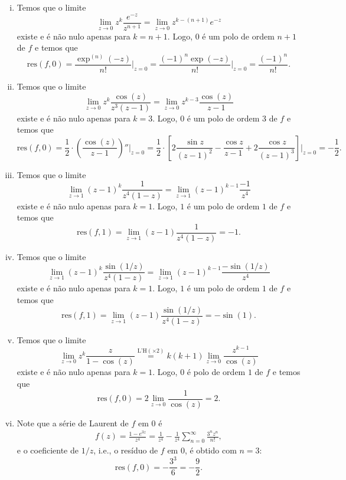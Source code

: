 \documentclass[12pt,a4paper]{article}
\newcommand{\res}{\mathrm{res}}
\begin{document}
\begin{enumerate}
\begin{enumerate}[(i)]
			\item Temos que o limite
			$$
			\lim\limits_{z\to 0}z^k\frac{e^{-z}}{z^{n+1}} = \lim\limits_{z\to 0}z^{k-(n+1)}e^{-z}
			$$
			existe e é não nulo apenas para $k=n+1$. Logo, $0$ é um polo de ordem $n+1$ de $f$ e temos que
			$$
			\res(f,0) = \frac{\exp^{(n)}(-z)}{n!}\Bigg|_{z=0} = \frac{(-1)^n\exp(-z)}{n!}\Bigg|_{z=0} = \frac{(-1)^n}{n!}.
			$$
			
			\item Temos que o limite
			$$
			\lim\limits_{z\to 0}z^k\frac{\cos(z)}{z^3(z-1)} = \lim\limits_{z\to 0}z^{k-3}\frac{\cos(z)}{z-1}
			$$
			existe e é não nulo apenas para $k=3$. Logo, $0$ é um polo de ordem $3$ de $f$ e temos que
			$$
			\res(f,0) = \frac{1}{2}\cdot\left(\frac{\cos(z)}{z-1}\right)''\Bigg|_{z=0} = \frac{1}{2}\cdot\left[ 2\frac{\sin z}{(z-1)^2} - \frac{\cos z}{z-1} + 2\frac{\cos z}{(z-1)^3} \right]\Bigg|_{z=0} = -\frac{1}{2}.
			$$
			
			\item Temos que o limite
			$$
			\lim\limits_{z\to 1}(z-1)^k\frac{1}{z^4(1-z)} = \lim\limits_{z\to 1}(z-1)^{k-1}\frac{-1}{z^4}
			$$
			existe e é não nulo apenas para $k=1$. Logo, $1$ é um polo de ordem $1$ de $f$ e temos que
			$$
			\res(f,1) = \lim\limits_{z\to 1}(z-1)\frac{1}{z^4(1-z)} = -1.
			$$
			
			\item Temos que o limite
			$$
			\lim\limits_{z\to 1}(z-1)^k\frac{\sin(1/z)}{z^4(1-z)} = \lim\limits_{z\to 1}(z-1)^{k-1}\frac{-\sin(1/z)}{z^4}
			$$
			existe e é não nulo apenas para $k=1$. Logo, $1$ é um polo de ordem $1$ de $f$ e temos que
			$$
			\res(f,1) = \lim\limits_{z\to 1}(z-1)\frac{\sin(1/z)}{z^4(1-z)} = -\sin(1).
			$$
			
			\item Temos que o limite
			$$
			\lim\limits_{z\to 0}z^k\frac{z}{1-\cos(z)} \stackrel{\text{L'H}(\times 2)}{=} k(k+1)\lim\limits_{z\to 0}\frac{z^{k-1}}{\cos(z)}
			$$
			existe e é não nulo apenas para $k=1$. Logo, $0$ é polo de ordem $1$ de $f$ e temos que
			$$
			\res(f,0) = 2\lim\limits_{z\to 0}\frac{1}{\cos(z)} = 2.
			$$
			
			\item Note que a série de Laurent de $f$ em $0$ é
			\begin{align*}
			f(z) = \frac{1-e^{3z}}{z^4} = \frac{1}{z^4} - \frac{1}{z^4}\sum_{n=0}^{\infty}\frac{3^nz^n}{n!},
			\end{align*}
			e o coeficiente de $1/z$, i.e., o resíduo de $f$ em $0$, é obtido com $n=3$:
			$$
			\res(f,0) = -\frac{3^3}{6} = -\frac{9}{2}.
			$$
			

\end{enumerate}
\end{enumerate}
\end{document}
